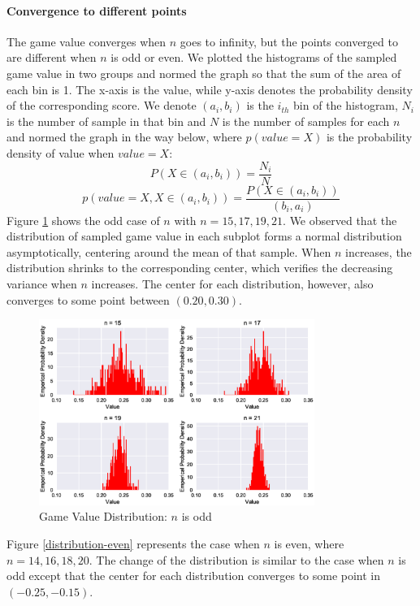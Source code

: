 \documentclass[a4paper,english]{article}
\begin{document}
\begin{spacing}{1.4}
\paragraph{Convergence to different points}
The game value converges when $n$ goes to infinity, but the points converged to are different when $n$ is odd or even.
We plotted the histograms of the sampled game value in two groups and normed the graph so that the sum of the area of each bin is 1. The x-axis is the value, while y-axis denotes the probability density of the corresponding score. We denote $(a_i,b_i)$ is the $i_{th}$ bin of the histogram, $N_i$ is the number of sample in that bin and $N$ is the number of samples for each $n$ and normed the graph in the way below, where $p(value=X)$ is the probability density of value when $value = X$:
\begin{equation*}
    P(X \in (a_i,b_i)) = \frac{N_i}{N}
\end{equation*}
\begin{equation*}
    p(value = X, X \in (a_i,b_i)) = \frac{P(X \in (a_i,b_i))}{(b_i,a_i)}
\end{equation*}
Figure \ref{distribution-odd} shows the odd case of $n$ with $n=15,17,19,21$. We observed that the distribution of sampled game value in each subplot forms a normal distribution asymptotically, centering around the mean of that sample. When $n$ increases, the distribution shrinks to the corresponding center, which verifies the decreasing variance when $n$ increases. The center for each distribution, however, also converges to some point between $(0.20,0.30)$.
\begin{figure}[htb!] \label{distribution-odd}
\centering
\includegraphics[width=0.8\textwidth]{figures/plot2.eps}
\caption{Game Value Distribution: $n$ is odd}
\end{figure}
Figure \ref{distribution-even} represents the case when $n$ is even, where $n = 14, 16, 18, 20$. The change of the distribution is similar to the case when $n$ is odd except that the center for each distribution converges to some point in $(-0.25, -0.15)$.

\end{spacing}
\end{document}

